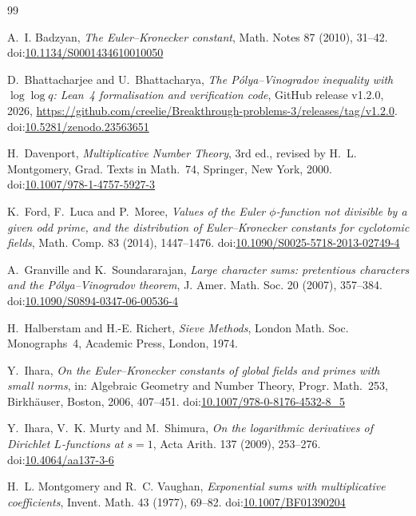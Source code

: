 \documentclass{aomart}
\numberwithin{equation}{section}
\newcommand{\releaseURL}{https://github.com/creelie/Breakthrough-problems-3/releases/tag/v1.2.0}
\theoremstyle{definition}
\begin{document}
\begin{thebibliography}{99}

 A.~I. Badzyan, \emph{The Euler--Kronecker constant}, Math. Notes 87
(2010), 31--42. doi:\href{https://doi.org/10.1134/S0001434610010050}{10.1134/S0001434610010050}

 D.~Bhattacharjee and U.~Bhattacharya, \emph{The P\'olya--Vinogradov inequality
with $\log\log q$: Lean~4 formalisation and verification code}, GitHub release v1.2.0, 2026,
\url{\releaseURL}. doi:\href{https://doi.org/10.5281/zenodo.23563651}{10.5281/zenodo.23563651}

 H.~Davenport, \emph{Multiplicative Number Theory}, 3rd ed., revised by
H.~L. Montgomery, Grad. Texts in Math.~74, Springer, New York, 2000. doi:\href{https://doi.org/10.1007/978-1-4757-5927-3}{10.1007/978-1-4757-5927-3}

 K.~Ford, F.~Luca and P.~Moree, \emph{Values of the Euler $\phi$-function not
divisible by a given odd prime, and the distribution of Euler--Kronecker constants for cyclotomic
fields}, Math. Comp. 83 (2014), 1447--1476. doi:\href{https://doi.org/10.1090/S0025-5718-2013-02749-4}{10.1090/S0025-5718-2013-02749-4}

 A.~Granville and K.~Soundararajan, \emph{Large character sums: pretentious
characters and the P\'olya--Vinogradov theorem}, J. Amer. Math. Soc. 20 (2007),
357--384. doi:\href{https://doi.org/10.1090/S0894-0347-06-00536-4}{10.1090/S0894-0347-06-00536-4}

 H.~Halberstam and H.-E. Richert, \emph{Sieve Methods}, London Math. Soc.
Monographs~4, Academic Press, London, 1974.

 Y.~Ihara, \emph{On the Euler--Kronecker constants of global fields and primes
with small norms}, in: Algebraic Geometry and Number Theory, Progr. Math.~253, Birkh\"auser,
Boston, 2006, 407--451. doi:\href{https://doi.org/10.1007/978-0-8176-4532-8_5}{10.1007/978-0-8176-4532-8\_5}

 Y.~Ihara, V.~K. Murty and M.~Shimura, \emph{On the logarithmic derivatives of
Dirichlet $L$-functions at $s=1$}, Acta Arith. 137 (2009), 253--276. doi:\href{https://doi.org/10.4064/aa137-3-6}{10.4064/aa137-3-6}

 H.~L. Montgomery and R.~C. Vaughan, \emph{Exponential sums with multiplicative
coefficients}, Invent. Math. 43 (1977), 69--82. doi:\href{https://doi.org/10.1007/BF01390204}{10.1007/BF01390204}


\end{thebibliography}
\end{document}
